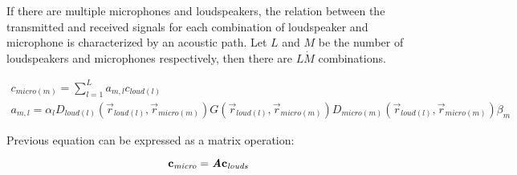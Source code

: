 If there are multiple microphones and loudspeakers, the relation between the transmitted and received signals for each combination of loudspeaker and microphone is characterized by an acoustic path. Let $L$ and $M$ be the number of loudspeakers and microphones respectively, then there are $L \dot M$ combinations.

\begin{gather}
c_{\mathit{micro} (m)} = \sum_{l = 1}^{L} a_{m,l} c_{\mathit{loud} (l)} \label{transEquationCalibrationConcrete} \\
a_{m,l} = \alpha_l D_{loud (l)}(\vec{r}_{loud (l)}, \vec{r}_{micro (m)}) G(\vec{r}_{loud (l)}, \vec{r}_{micro (m)}) D_{micro (m)}(\vec{r}_{loud (l)}, \vec{r}_{micro (m)}) \beta_m
\label{acPathTheoric}
\end{gather}

Previous equation can be expressed as a matrix operation:

\begin{equation}
\mathbf{c_\mathit{micro}} = \bm{\mathit{A}} \mathbf{c_\mathit{louds}}
\label{transEqMatrix}
\end{equation}



